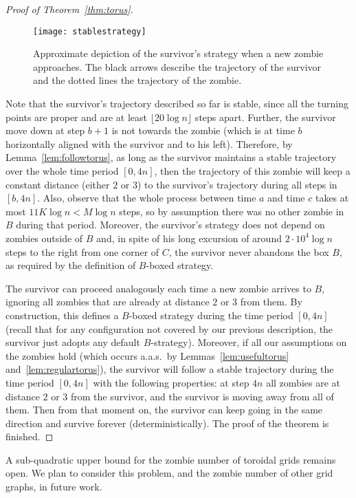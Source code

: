 \documentclass[12pt]{amsart}
\begin{document}
\begin{proof}[Proof of Theorem~\ref{thm:torus}]
\begin{figure}
\texttt{[image: stablestrategy]}
\caption{Approximate depiction of the survivor's strategy when a new zombie approaches. The black arrows describe the trajectory of the survivor and the dotted lines the trajectory of the zombie.}
\label{fig:stablestrategy}
\end{figure}

Note that the survivor's trajectory described so far is stable, since all the turning points are proper and are at least $\lfloor 20\log n \rfloor$ steps apart. Further, the survivor move down at step $b+1$ is
not towards the zombie (which is at time $b$ horizontally aligned with the survivor and to his left). Therefore, by Lemma~\ref{lem:followtorus}, as long as the survivor maintains a stable
trajectory over the whole time period $[0,4n]$, then the trajectory of this zombie will keep a constant distance (either $2$ or $3$) to the survivor's trajectory during all steps in $[b,4n]$. Also, observe
that the whole process between time $a$ and time $c$ takes at most $11K\log n < M\log n$ steps, so by assumption there was no other zombie in $B$ during that period. Moreover, the survivor's strategy
does not depend on zombies outside of $B$ and, in spite of his long excursion of around $2 \cdot 10^4 \log n$ steps to the right from one corner of $C$, the survivor never abandons the box $B$, as required by the
definition of $B$-boxed strategy.

The survivor can proceed analogously each time a new zombie arrives to $B$, ignoring all zombies that are already at distance $2$ or $3$ from them. By construction, this defines a $B$-boxed strategy during the time period $[0,4n]$ (recall that for any configuration not covered by our previous description, the survivor just adopts any default $B$-strategy). Moreover, if all our
assumptions on the zombies hold (which occurs a.a.s.~by Lemmas~\ref{lem:usefultorus} and~\ref{lem:regulartorus}), the survivor will follow a stable trajectory during the time period $[0,4n]$ with
the following properties: at step $4n$ all zombies are at distance $2$ or $3$ from the survivor, and the survivor is moving away from all of them. Then from that moment on, the survivor can keep
going in the same direction and survive forever (deterministically). The proof of the theorem is finished.
\end{proof}

A sub-quadratic upper bound for the zombie number of toroidal grids remains open. We plan to consider this problem, and the zombie number of other grid graphs, in future work.
\end{document}
